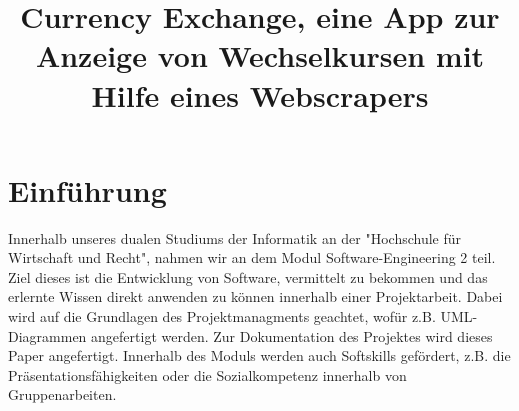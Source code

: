 \documentclass[conference]{IEEEtran}
\begin{document}
\title{Currency Exchange, eine App zur Anzeige von Wechselkursen mit Hilfe eines Webscrapers}


\author{
\and
{}
\and
{}
}

\maketitle


\section{Einführung}
Innerhalb unseres dualen Studiums der Informatik an der "Hochschule für Wirtschaft und Recht", nahmen wir an dem Modul Software-Engineering 2 teil. Ziel dieses ist die Entwicklung von Software, vermittelt zu bekommen und das erlernte Wissen direkt anwenden zu können innerhalb einer Projektarbeit. Dabei wird auf die Grundlagen des Projektmanagments geachtet, wofür z.B. UML-Diagrammen angefertigt werden. Zur Dokumentation des Projektes wird dieses Paper angefertigt. 
Innerhalb des Moduls werden auch Softskills gefördert, z.B. die Präsentationsfähigkeiten oder die Sozialkompetenz innerhalb von Gruppenarbeiten.
\end{document}
